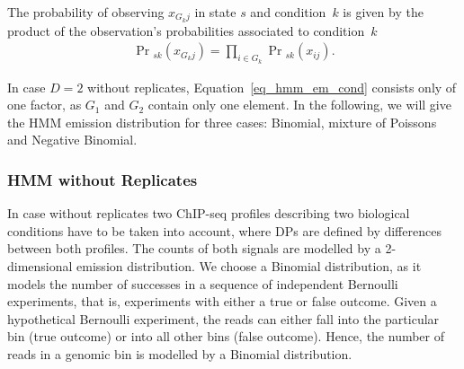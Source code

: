 \noindent The probability of observing $x_{G_kj}$ in state $s$ and condition~$k$ is given by the product of the observation's probabilities associated to condition~$k$
\begin{align}
  \Pr\textstyle_{sk}(x_{G_kj}) = \prod_{i \in G_k} \Pr\textstyle_{sk}(x_{ij}). \label{eq_hmm_em_cond} 
\end{align}

\noindent
In case $D=2$ without replicates, Equation~\ref{eq_hmm_em_cond} consists only of one factor, as $G_1$ and $G_2$ contain only one element.
In the following, we will give the HMM emission distribution for three cases: Binomial, mixture of Poissons and Negative Binomial.








\subsubsection{HMM without Replicates}
\label{sec_method_hmm_without}
In case without replicates two ChIP-seq profiles describing two biological conditions have to be taken into account, where DPs are defined by differences between both profiles.
The counts of both signals are modelled by a 2-dimensional emission distribution.
We choose a Binomial distribution, as it models the number of successes in a sequence of independent Bernoulli experiments, that is, experiments with either a true or false outcome.
Given a hypothetical Bernoulli experiment, the reads can either fall into the particular bin (true outcome) or into all other bins (false outcome).
Hence, the number of reads in a genomic bin is modelled by a Binomial distribution.


